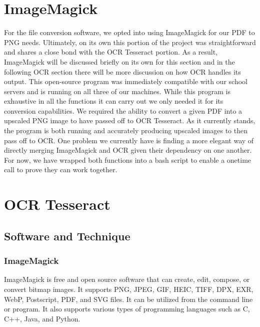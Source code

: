 \documentclass[onecolumn, draftclsnofoot,10pt, compsoc]{IEEEtran}
\begin{document}
\section{ImageMagick}
For the file conversion software, we opted into using ImageMagick for our PDF to PNG needs. Ultimately, on its own this portion of the project was straightforward and shares a close bond with the OCR Tesseract portion. As a result, ImageMagick will be discussed briefly on its own for this section and in the following OCR section there will be more discussion on how OCR handles its output. This open-source program was immediately compatible with our school servers and is running on all three of our machines. While this program is exhaustive in all the functions it can carry out we only needed it for its conversion capabilities. We required the ability to convert a given PDF into a upscaled PNG image to have passed off to OCR Tesseract. As it currently stands, the program is both running and accurately producing upscaled images to then pass off to OCR. One problem we currently have is finding a more elegant way of directly merging ImageMagick and OCR given their dependency on one another. For now, we have wrapped both functions into a bash script to enable a onetime call to prove they can work together.

\section{OCR Tesseract}
\subsection{Software and Technique}
\subsubsection{ImageMagick}
ImageMagick is free and open source software that can create, edit, compose, or convert bitmap images. It supports PNG, JPEG, GIF, HEIC, TIFF, DPX, EXR, WebP, Postscript, PDF, and SVG files. It can be utilized from the command line or program. It also supports various types of programming languages such as C, C++, Java, and Python.
\end{document}
